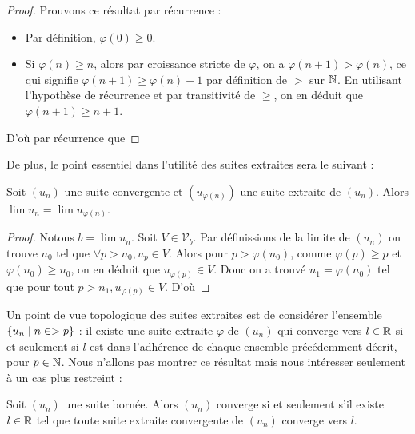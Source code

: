 \begin{proof}
    Prouvons ce résultat par récurrence :
    \begin{itemize}[label=$\bullet$]
        \item Par définition, $\varphi(0) \geq 0$.
        \item Si $\varphi(n) \geq n$, alors par croissance stricte de $\varphi$, on a $\varphi(n+1) > \varphi(n)$, ce qui signifie $\varphi(n+1) \geq \varphi(n) + 1$ par définition de $>$ sur $\mathbb{N}$. En utilisant l'hypothèse de récurrence et par transitivité de $\geq$, on en déduit que $\varphi(n+1) \geq n+1$.
    \end{itemize}
    D'où par récurrence que 
\end{proof}

De plus, le point essentiel dans l'utilité des suites extraites sera le suivant :

\begin{prop}
    Soit $(u_n)$ une suite convergente et $(u_{\varphi(n)})$ une suite extraite de $(u_n)$. Alors $\lim u_n = \lim u_{\varphi(n)}$.
\end{prop}

\begin{proof}
    Notons $b = \lim u_n$. Soit $V\in\mathcal V_b$. Par définissions de la limite de $(u_n)$ on trouve $n_0$ tel que $\forall p > n_0, u_p\in V$. Alors pour $p > \varphi(n_0)$, comme $\varphi(p) \geq p$ et $\varphi(n_0) \geq n_0$, on en déduit que $u_{\varphi(p)} \in V$. Donc on a trouvé $n_1 = \varphi(n_0)$ tel que pour tout $p > n_1, u_{\varphi(p)} \in V$. D'où 
\end{proof}

Un point de vue topologique des suites extraites est de considérer l'ensemble $\{u_n\;|\;n\in > p\}$ : il existe une suite extraite $\varphi$ de $(u_n)$ qui converge vers $l\in\mathbb{R}$ si et seulement si $l$ est dans l'adhérence de chaque ensemble précédemment décrit, pour $p\in\mathbb{N}$. Nous n'allons pas montrer ce résultat mais nous intéresser seulement à un cas plus restreint :

\begin{prop}
    Soit $(u_n)$ une suite bornée. Alors $(u_n)$ converge si et seulement s'il existe $l\in\mathbb{R}$ tel que toute suite extraite convergente de $(u_n)$ converge vers $l$.
\end{prop}


